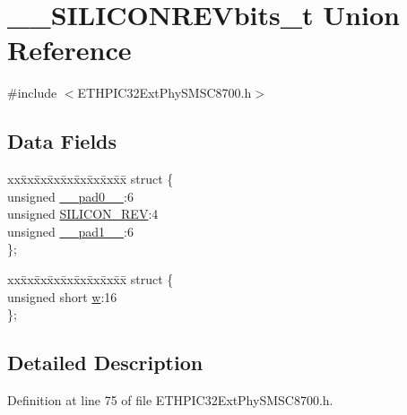 \hypertarget{union_____s_i_l_i_c_o_n_r_e_vbits__t}{}\section{\+\_\+\+\_\+\+S\+I\+L\+I\+C\+O\+N\+R\+E\+Vbits\+\_\+t Union Reference}
\label{union_____s_i_l_i_c_o_n_r_e_vbits__t}


{\ttfamily \#include $<$E\+T\+H\+P\+I\+C32\+Ext\+Phy\+S\+M\+S\+C8700.\+h$>$}

\subsection*{Data Fields}
\begin{DoxyCompactItemize}
\item 
\begin{tabbing}
xx\=xx\=xx\=xx\=xx\=xx\=xx\=xx\=xx\=\kill
struct \{\\
\>unsigned \hyperlink{union_____s_i_l_i_c_o_n_r_e_vbits__t_adf71f3d8410c1f1dbbc96680a92c49af}{\_\_pad0\_\_}:6\\
\>unsigned \hyperlink{union_____s_i_l_i_c_o_n_r_e_vbits__t_af70c9f0ac03ef3278000e7a3435db01a}{SILICON\_REV}:4\\
\>unsigned \hyperlink{union_____s_i_l_i_c_o_n_r_e_vbits__t_acaf2d0924a107ec6e8d2e31febaf66f9}{\_\_pad1\_\_}:6\\
\}; \\

\end{tabbing}\item 
\begin{tabbing}
xx\=xx\=xx\=xx\=xx\=xx\=xx\=xx\=xx\=\kill
struct \{\\
\>unsigned short \hyperlink{union_____s_i_l_i_c_o_n_r_e_vbits__t_a160850a4684a3e82c2323033964f2e98}{w}:16\\
\}; \\

\end{tabbing}\end{DoxyCompactItemize}


\subsection{Detailed Description}


Definition at line 75 of file E\+T\+H\+P\+I\+C32\+Ext\+Phy\+S\+M\+S\+C8700.\+h.



